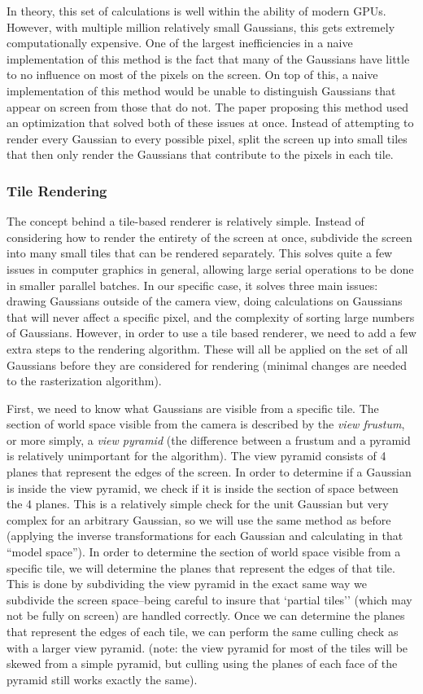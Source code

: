 \documentclass[12pt, a4paper, twocolumn]{article}
\begin{document}
In theory, this set of calculations is well within the ability of modern GPUs. However, with multiple million relatively small Gaussians, this gets extremely computationally expensive. One of the largest inefficiencies in a naive implementation of this method is the fact that many of the Gaussians have little to no influence on most of the pixels on the screen. On top of this, a naive implementation of this method would be unable to distinguish Gaussians that appear on screen from those that do not. The paper proposing this method used an optimization that solved both of these issues at once. Instead of attempting to render every Gaussian to every possible pixel, split the screen up into small tiles that then only render the Gaussians that contribute to the pixels in each tile.

\subsubsection{Tile Rendering}

The concept behind a tile-based renderer is relatively simple. Instead of considering how to render the entirety of the screen at once, subdivide the screen into many small tiles that can be rendered separately. This solves quite a few issues in computer graphics in general, allowing large serial operations to be done in smaller parallel batches. In our specific case, it solves three main issues: drawing Gaussians outside of the camera view, doing calculations on Gaussians that will never affect a specific pixel, and the complexity of sorting large numbers of Gaussians. However, in order to use a tile based renderer, we need to add a few extra steps to the rendering algorithm. These will all be applied on the set of all Gaussians before they are considered for rendering (minimal changes are needed to the rasterization algorithm).

First, we need to know what Gaussians are visible from a specific tile. The section of world space visible from the camera is described by the \textit{view frustum}, or more simply, a \textit{view pyramid} (the difference between a frustum and a pyramid is relatively unimportant for the algorithm). The view pyramid consists of 4 planes that represent the edges of the screen. In order to determine if a Gaussian is inside the view pyramid, we check if it is inside the section of space between the 4 planes. This is a relatively simple check for the unit Gaussian but very complex for an arbitrary Gaussian, so we will use the same method as before (applying the inverse transformations for each Gaussian and calculating in that ``model space''). In order to determine the section of world space visible from a specific tile, we will determine the planes that represent the edges of that tile. This is done by subdividing the view pyramid in the exact same way we subdivide the screen space--being careful to insure that `partial tiles'' (which may not be fully on screen) are handled correctly. Once we can determine the planes that represent the edges of each tile, we can perform the same culling check as with a larger view pyramid. (note: the view pyramid for most of the tiles will be skewed from a simple pyramid, but culling using the planes of each face of the pyramid still works exactly the same). 
\end{document}
